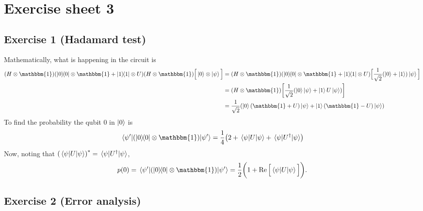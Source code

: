 \section{Exercise sheet 3}
\subsection{Exercise 1 (Hadamard test)}
Mathematically, what is happening in the circuit is
\begin{subequations}
\begin{align}
\qty(H\otimes\mathbbm{1})\qty(\dyad{0}{0}\otimes\mathbbm{1}+\dyad{1}{1}\otimes U)\qty(H\otimes \mathbbm{1})
\Big[\ket{0}\otimes \ket{\psi}\Big]&=
\qty(H\otimes\mathbbm{1})\qty(\dyad{0}{0}\otimes\mathbbm{1}+\dyad{1}{1}\otimes U)
\Big[\frac{1}{\sqrt{2}}\qty(\ket{0}+\ket{1})\ket{\psi}\Big]\\
&=\qty(H\otimes\mathbbm{1})\qty[\frac{1}{\sqrt{2}}\qty(\ket{0}\ket{\psi}+\ket{1}U\ket{\psi})]\\
&=\frac{1}{\sqrt{2}}
\qty(\ket{0}\qty(\mathbbm{1}+U)\ket{\psi}+
	\ket{1}\qty(\mathbbm{1}-U)\ket{\psi})
\end{align}
\end{subequations}
To find the probability the qubit $0$ in $\ket{0}$ is
\begin{align}
\matrixel{\psi'}{\qty(\dyad{0}{0}\otimes\mathbbm{1})}{\psi'}=
	\frac{1}{4}\qty(2+\matrixel{\psi}{U}{\psi}+\matrixel{\psi}{U^{\dagger}}{\psi})
\end{align}
Now, noting that $\qty(\matrixel{\psi}{U}{\psi})^*=\matrixel{\psi}{U^{\dagger}}{\psi}$,
\begin{align}
p(0)=\matrixel{\psi'}{\qty(\dyad{0}{0}\otimes\mathbbm{1})}{\psi'}=
	\frac{1}{2}\bigg(1+\Re \Big[\matrixel{\psi}{U}{\psi}\Big]\bigg).
\end{align}

\subsection{Exercise 2 (Error analysis)}

